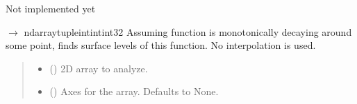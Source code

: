 \documentclass[letterpaper,10pt,english]{sphinxmanual}
\begin{document}
\begin{fulllineitems}
\label{\detokenize{source/stattools:stattools.find_decreasing_radial_surface_levels}}
\pysigstartsignatures
\pysiglinewithargsret
{}
{\sphinxparamcomma {}}
{}
\pysigstopsignatures
\sphinxAtStartPar
Not implemented yet

\end{fulllineitems}


\begin{fulllineitems}
\label{\detokenize{source/stattools:stattools.find_decreasing_surface_levels2d}}
\pysigstartsignatures
\pysiglinewithargsret
{}
{\sphinxparamcomma {}\sphinxparamcomma {}}
{{ $\rightarrow$ ndarray\DUrole{p}{{[}}tuple\DUrole{p}{{[}}intint\DUrole{p}{{]}}int32\DUrole{p}{{]}}}}
\pysigstopsignatures
\sphinxAtStartPar
Assuming function is monotonically decaying around some point, finds surface levels of this function.
No interpolation is used.
\begin{quote}\begin{description}
\begin{itemize}
\item {} 
\sphinxAtStartPar
{} () \textendash{} 2D array to analyze.

\item {} 
\sphinxAtStartPar
{} (\sphinxstyleliteralemphasis{\sphinxupquote{, }}) \textendash{} Axes for the array. Defaults to None.


\end{itemize}
\end{description}
\end{quote}
\end{fulllineitems}
\end{document}
